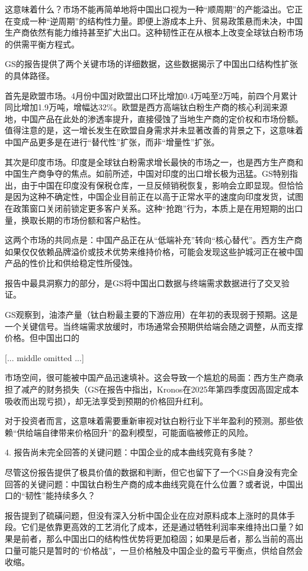 \documentclass[11pt]{ctexart}
\begin{document}
这意味着什么？市场不能再简单地将中国出口视为一种“顺周期”的产能溢出。它正在变成一种“逆周期”的结构性力量。即便上游成本上升、贸易政策悬而未决，中国生产商依然有能力维持甚至扩大出口。这种韧性正在从根本上改变全球钛白粉市场的供需平衡方程式。

GS的报告提供了两个关键市场的详细数据，这些数据揭示了中国出口结构性扩张的具体路径。

首先是欧盟市场。4月份中国对欧盟出口环比增加0.4万吨至2万吨，前四个月累计同比增加1.9万吨，增幅达32\%。欧盟是西方高端钛白粉生产商的核心利润来源地，中国产品在此处的渗透率提升，直接侵蚀了当地生产商的定价权和市场份额。值得注意的是，这一增长发生在欧盟自身需求并未显著改善的背景之下，这意味着中国产品更多是在进行“替代性”扩张，而非“增量性”扩张。

其次是印度市场。印度是全球钛白粉需求增长最快的市场之一，也是西方生产商和中国生产商争夺的焦点。如前所述，中国对印度的出口增长极为迅猛。GS特别指出，由于中国在印度没有保税仓库，一旦反倾销税恢复，影响会立即显现。但恰恰是因为这种不确定性，中国企业目前正在以高于正常水平的速度向印度发货，试图在政策窗口关闭前锁定更多客户关系。这种“抢跑”行为，本质上是在用短期的出口量，换取长期的市场份额和客户粘性。

这两个市场的共同点是：中国产品正在从“低端补充”转向“核心替代”。西方生产商如果仅仅依赖品牌溢价或技术优势来维持价格，可能会发现这些护城河正在被中国产品的性价比和供给稳定性所侵蚀。

报告中最具洞察力的部分，是GS将中国出口数据与终端需求数据进行了交叉验证。

GS观察到，油漆产量（钛白粉最主要的下游应用）在年初的表现弱于预期。这是一个关键信号。当终端需求放缓时，市场通常会预期供给端会随之调整，从而支撑价格。但中国出口的

[... middle omitted ...]

市场空间，很可能被中国产品迅速填补。这会导致一个尴尬的局面：西方生产商承担了减产的财务损失（GS在报告中指出，Kronos在2025年第四季度因高固定成本吸收而出现亏损），却无法享受到预期的价格回升红利。

对于投资者而言，这意味着需要重新审视对钛白粉行业下半年盈利的预测。那些依赖“供给端自律带来价格回升”的盈利模型，可能面临被修正的风险。

4. 报告尚未完全回答的关键问题：中国企业的成本曲线究竟有多陡？

尽管这份报告提供了极具价值的数据和判断，但它也留下了一个GS自身没有完全回答的关键问题：中国钛白粉生产商的成本曲线究竟在什么位置？或者说，中国出口的“韧性”能持续多久？

报告提到了硫磺问题，但没有深入分析中国企业在应对原料成本上涨时的具体手段。它们是依靠更高效的工艺消化了成本，还是通过牺牲利润率来维持出口量？如果是前者，那么中国出口的结构性优势将更加稳固；如果是后者，那么当前的高出口量可能只是暂时的“价格战”，一旦价格触及中国企业的盈亏平衡点，供给自然会收缩。
\end{document}
